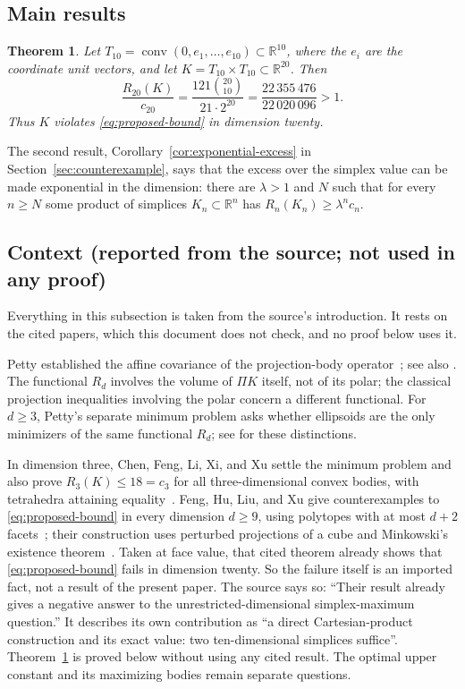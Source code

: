 \documentclass[11pt]{article}
\newtheorem{theorem}{Theorem}
\newcommand{\R}{\mathbb R}
\DeclareMathOperator{\conv}{conv}
\begin{document}
\subsection{Main results}

\begin{theorem}\label{thm:counterexample}
Let \(T_{10}=\conv(0,e_1,\ldots,e_{10})\subset\R^{10}\), where the
\(e_i\) are the coordinate unit vectors, and let
\(K=T_{10}\times T_{10}\subset\R^{20}\). Then
\[
 \frac{R_{20}(K)}{c_{20}}
 =\frac{121\binom{20}{10}}{21\cdot2^{20}}
 =\frac{22\,355\,476}{22\,020\,096}>1.
\]
Thus \(K\) violates \eqref{eq:proposed-bound} in dimension twenty.
\end{theorem}

The second result, Corollary~\ref{cor:exponential-excess} in
Section~\ref{sec:counterexample}, says that the excess over the simplex
value can be made exponential in the dimension: there are \(\lambda>1\) and
\(N\) such that for every \(n\ge N\) some product of simplices
\(K_n\subset\R^n\) has \(R_n(K_n)\ge\lambda^n c_n\).

\subsection{Context (reported from the source; not used in any proof)}

Everything in this subsection is taken from the source's introduction. It
rests on the cited papers, which this document does not check, and no
proof below uses it.

Petty established the affine covariance of the projection-body
operator~\cite{Petty}; see also \cite[Equation~(1)]{Ludwig}. The functional
\(R_d\) involves the volume of \(\Pi K\) itself, not of its polar; the
classical projection inequalities involving the polar concern a different
functional. For \(d\ge3\), Petty's separate minimum problem asks whether
ellipsoids are the only minimizers of the same functional \(R_d\); see
\cite[Section~1]{Saroglou} for these distinctions.

In dimension three, Chen, Feng, Li, Xi, and Xu settle the minimum problem
and also prove \(R_3(K)\le18=c_3\) for all three-dimensional convex bodies,
with tetrahedra attaining equality~\cite[Theorems~1.1 and~1.2]{ChenEtAl}.
Feng, Hu, Liu, and Xu give counterexamples to \eqref{eq:proposed-bound} in
every dimension \(d\ge9\), using polytopes with at most \(d+2\)
facets~\cite[Theorem~1.3]{FengEtAl}; their construction uses perturbed
projections of a cube and Minkowski's existence
theorem~\cite[Section~4]{FengEtAl}. Taken at face value, that cited theorem
already shows that \eqref{eq:proposed-bound} fails in dimension twenty. So
the failure itself is an imported fact, not a result of the present paper.
The source says so: ``Their result already gives a negative answer to the
unrestricted-dimensional simplex-maximum question.'' It describes its own
contribution as ``a direct Cartesian-product construction and its exact
value: two ten-dimensional simplices suffice''.
Theorem~\ref{thm:counterexample} is proved below without using any cited
result. The optimal upper constant and its maximizing bodies remain
separate questions.
\end{document}
